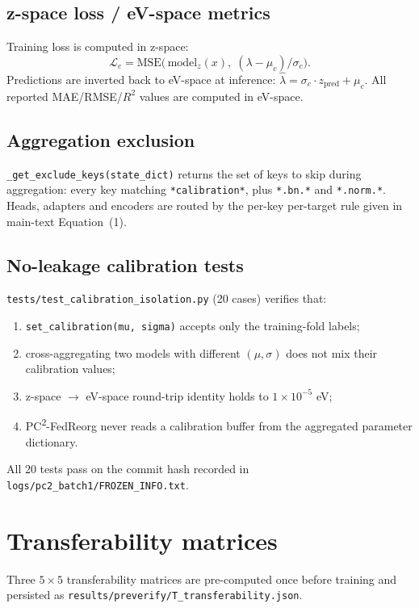 \documentclass[11pt,a4paper]{article}
\newcommand{\PC}{PC\textsuperscript{2}-FedReorg}
\begin{document}
\subsection{z-space loss / eV-space metrics}
Training loss is computed in z-space:
\[
\mathcal{L}_c = \mathrm{MSE}\!\bigl(\,\mathrm{model}_z(x), \; (\lambda - \mu_c)/\sigma_c\bigr).
\]
Predictions are inverted back to eV-space at inference: $\hat\lambda = \sigma_c \cdot z_{\mathrm{pred}} + \mu_c$. All reported MAE/RMSE/$R^2$ values are computed in eV-space.

\subsection{Aggregation exclusion}
\verb|_get_exclude_keys(state_dict)| returns the set of keys to skip during aggregation: every key matching \verb|*calibration*|, plus \verb|*.bn.*| and \verb|*.norm.*|. Heads, adapters and encoders are routed by the per-key per-target rule given in main-text Equation~(1).

\subsection{No-leakage calibration tests}
\verb|tests/test_calibration_isolation.py| (20 cases) verifies that:
\begin{enumerate}
  \item \verb|set_calibration(mu, sigma)| accepts only the training-fold labels;
  \item cross-aggregating two models with different $(\mu, \sigma)$ does not mix their calibration values;
  \item z-space $\to$ eV-space round-trip identity holds to $1 \times 10^{-5}$ eV;
  \item \PC{} never reads a calibration buffer from the aggregated parameter dictionary.
\end{enumerate}
All 20 tests pass on the commit hash recorded in \texttt{logs/pc2\_batch1/FROZEN\_INFO.txt}.

\section{Transferability matrices}\label{si:gate}

Three $5\times 5$ transferability matrices are pre-computed once before training and persisted as \texttt{results/preverify/T\_transferability.json}.
\end{document}
